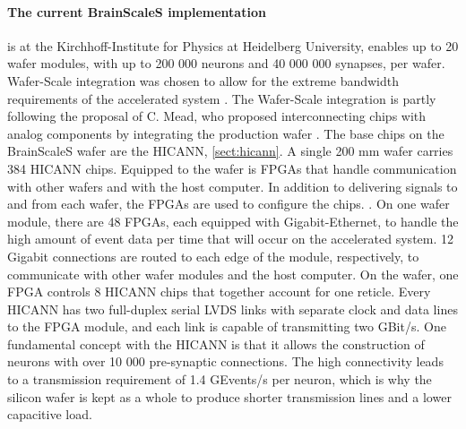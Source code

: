 \paragraph{The current BrainScaleS implementation} is at the Kirchhoff-Institute for Physics at Heidelberg University, enables up to 20 wafer modules, with up to 200 000 neurons and 40 000 000 synapses, per wafer.
Wafer-Scale integration was chosen to allow for the extreme bandwidth requirements of the accelerated system \cite{zoschke_full_2017}.
The Wafer-Scale integration is partly following the proposal of C. Mead, who proposed interconnecting chips with analog components by integrating the production wafer \cite{mead_neuromorphic_1990}.
The base chips on the BrainScaleS wafer are the HICANN, \vref{sect:hicann}.
A single 200 mm wafer carries 384 HICANN chips. Equipped to the wafer is FPGAs that handle communication with other wafers and with the host computer.
In addition to delivering signals to and from each wafer, the FPGAs are used to configure the chips. \cite{zoschke_full_2017}.
On one wafer module, there are 48 FPGAs, each equipped with Gigabit-Ethernet, to handle the high amount of event data per time that will occur on the accelerated system.
12 Gigabit connections are routed to each edge of the module, respectively, to communicate with other wafer modules and the host computer.
On the wafer, one FPGA controls 8 HICANN chips that together account for one reticle.
Every HICANN has two full-duplex serial LVDS links with separate clock and data lines to the FPGA module, and each link is capable of transmitting two GBit/s.
One fundamental concept with the HICANN is that it allows the construction of neurons with over 10 000 pre-synaptic connections.
The high connectivity leads to a transmission requirement of 1.4 GEvents/s per neuron, which is why the silicon wafer is kept as a whole to produce shorter transmission lines and a lower capacitive load.
\cite{zoschke_full_2017}


